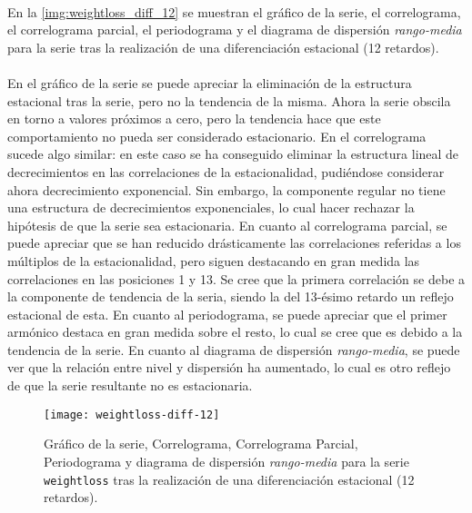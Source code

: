 \documentclass[a4paper, spanish]{article}
\begin{document}
        \paragraph{}
        En la \autoref{img:weightloss_diff_12} se muestran el gráfico de la serie, el correlograma, el correlograma parcial, el periodograma y el diagrama de dispersión \emph{rango-media} para la serie tras la realización de una diferenciación estacional (12 retardos).

        \paragraph{}
        En el gráfico de la serie se puede apreciar la eliminación de la estructura estacional tras la serie, pero no la tendencia de la misma. Ahora la serie obscila en torno a valores próximos a cero, pero la tendencia hace que este comportamiento no pueda ser considerado estacionario. En el correlograma sucede algo similar: en este caso se ha conseguido eliminar la estructura lineal de decrecimientos en las correlaciones de la estacionalidad, pudiéndose considerar ahora decrecimiento exponencial. Sin embargo, la componente regular no tiene una estructura de decrecimientos exponenciales, lo cual hacer rechazar la hipótesis de que la serie sea estacionaria. En cuanto al correlograma parcial, se puede apreciar que se han reducido drásticamente las correlaciones referidas a los múltiplos de la estacionalidad, pero siguen destacando en gran medida las correlaciones en las posiciones 1 y 13. Se cree que la primera correlación se debe a la componente de tendencia de la seria, siendo la del 13-ésimo retardo un reflejo estacional de esta. En cuanto al periodograma, se puede apreciar que el primer armónico destaca en gran medida sobre el resto, lo cual se cree que es debido a la tendencia de la serie. En cuanto al diagrama de dispersión \emph{rango-media}, se puede ver que la relación entre nivel y dispersión ha aumentado, lo cual es otro reflejo de que la serie resultante no es estacionaria.

        \begin{figure}[htb!]
          \texttt{[image: weightloss-diff-12]}
          \caption{Gráfico de la serie, Correlograma, Correlograma Parcial, Periodograma y diagrama de dispersión \emph{rango-media} para la serie \texttt{weightloss} tras la realización de una diferenciación estacional (12 retardos).}
          \label{img:weightloss_diff_12}
        \end{figure}
\end{document}
